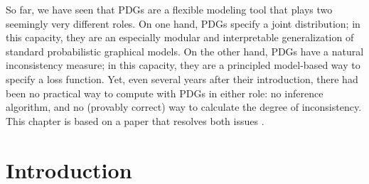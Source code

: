 \label{chap:infer}

\newif\ifvfull
    \vfulltrue %


So far, we have seen that PDGs are a flexible modeling tool that
    plays two seemingly very different roles.
On one hand, PDGs specify a joint distribution; in this capacity, they are an especially modular and interpretable generalization of standard probabilistic graphical models.
On the other hand, PDGs have a natural inconsistency measure; in this capacity, they are a principled model-based way to specify a loss function.
Yet, even several years after their introduction, there had been no practical way to compute with PDGs in either role: no inference algorithm, and no (provably correct) way to calculate the degree of inconsistency.
This chapter is based on a paper that resolves both issues  \cite{pdg-infer}.

\section{Introduction}

